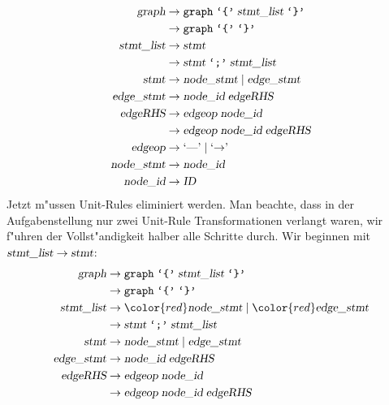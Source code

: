 \begin{loesung}
\begin{teilaufgaben}
\begin{align*}
\textsl{graph}     &\rightarrow \texttt{graph}\; \texttt{`\{'}\; \textsl{stmt\_list}\; \texttt{`\}'} \\
                   &\rightarrow \texttt{graph}\; \texttt{`\{'}\; \texttt{`\}'} \\
\textsl{stmt\_list}&\rightarrow \textsl{stmt}\\
                   &\rightarrow \textsl{stmt}\; \texttt{`;'}\; \textsl{stmt\_list}\\
\textsl{stmt}      &\rightarrow \textsl{node\_stmt}\; |\;
                                \textsl{edge\_stmt} \\
\textsl{edge\_stmt}&\rightarrow \textsl{node\_id}\; \textsl{edgeRHS} \\
\textsl{edgeRHS}   &\rightarrow \textsl{edgeop}\; \textsl{node\_id}\\
                   &\rightarrow \textsl{edgeop}\; \textsl{node\_id}\; \textsl{edgeRHS}\\
\textsl{edgeop}    &\rightarrow \textrm{`\text{---}'}\; |\; \textrm{`$\rightarrow$'}\; \\
\textsl{node\_stmt}&\rightarrow \textsl{node\_id} \\
\textsl{node\_id}  &\rightarrow \textsl{ID}
\end{align*}
Jetzt m"ussen Unit-Rules eliminiert werden. Man beachte, dass in der Aufgabenstellung
nur zwei Unit-Rule Transformationen verlangt waren, wir f"uhren der Vollst"andigkeit
halber alle Schritte durch.
Wir beginnen mit $\textsl{stmt\_list}\to\textsl{stmt}$:
\begin{align*}
\textsl{graph}     &\rightarrow \texttt{graph}\; \texttt{`\{'}\; \textsl{stmt\_list}\; \texttt{`\}'} \\
                   &\rightarrow \texttt{graph}\; \texttt{`\{'}\; \texttt{`\}'} \\
\textsl{stmt\_list}&\rightarrow {\color{red}\textsl{node\_stmt}}\; |\;
                                {\color{red}\textsl{edge\_stmt}} \\
                   &\rightarrow \textsl{stmt}\; \texttt{`;'}\; \textsl{stmt\_list}\\
\textsl{stmt}      &\rightarrow \textsl{node\_stmt}\; |\;
                                \textsl{edge\_stmt} \\
\textsl{edge\_stmt}&\rightarrow \textsl{node\_id}\; \textsl{edgeRHS} \\
\textsl{edgeRHS}   &\rightarrow \textsl{edgeop}\; \textsl{node\_id}\\
                   &\rightarrow \textsl{edgeop}\; \textsl{node\_id}\; \textsl{edgeRHS}\\

\end{align*}
\end{teilaufgaben}
\end{loesung}
